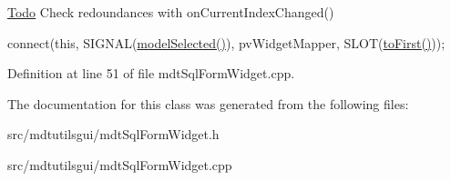 \begin{Desc}
\item[\hyperlink{todo__todo000062}{Todo}]Check redoundances with onCurrentIndexChanged() \end{Desc}


connect(this, SIGNAL(\hyperlink{classmdt_abstract_sql_widget_a6787c093d9b0b64a1e8d3794ba505604}{modelSelected()}), pvWidgetMapper, SLOT(\hyperlink{classmdt_sql_form_widget_a4bb7ddf419e845de2d1a7c1ef95e48a8}{toFirst()})); 



Definition at line 51 of file mdtSqlFormWidget.cpp.



The documentation for this class was generated from the following files:\begin{DoxyCompactItemize}
\item 
src/mdtutilsgui/mdtSqlFormWidget.h\item 
src/mdtutilsgui/mdtSqlFormWidget.cpp\end{DoxyCompactItemize}
